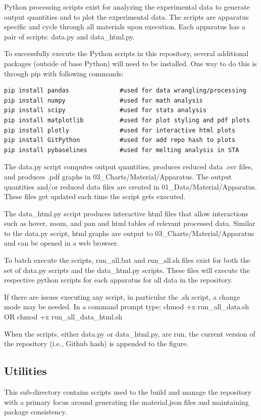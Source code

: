 \documentclass[12pt,oneside]{book}
\begin{document}
Python processing scripts exist for analyzing the experimental data to generate output quantities and to plot the experimental data. The scripts are apparatus specific and cycle through all materials upon execution. Each apparatus has a pair of scripts: data.py and data\_html.py.

To successfully execute the Python scripts in this repository, several additional packages (outside of base Python) will need to be installed. One way to do this is through pip with following commands:

\begin{verbatim}
pip install pandas              #used for data wrangling/processing
pip install numpy               #used for math analysis
pip install scipy               #used for stats analysis
pip install matplotlib          #used for plot styling and pdf plots
pip install plotly              #used for interactive html plots
pip install GitPython           #used for add repo hash to plots
pip install pybaselines         #used for melting analysis in STA
\end{verbatim}

The data.py script computes output quantities, produces reduced data .csv files, and produces .pdf graphs in 03\_Charts/Material/Apparatus. The output quantities and/or reduced data files are created in 01\_Data/Material/Apparatus. These files get updated each time the script gets executed.

The data\_html.py script produces interactive html files that allow interactions such as hover, zoom, and pan and html tables of relevant processed data. Similar to the data.py script, html graphs are output to 03\_Charts/Material/Apparatus and can be opened in a web browser.

To batch execute the scripts, run\_all.bat and run\_all.sh files exist for both the set of data.py scripts and the data\_html.py scripts. These files will execute the respective python scripts for each apparatus for all data in the repository.

If there are issues executing any script, in particular the .sh script, a change mode may be needed. In a command prompt type: chmod +x run\_all\_data.sh OR chmod +x run\_all\_data\_html.sh

When the scripts, either data.py or data\_html.py, are run, the current version of the repository (i.e., Github hash) is appended to the figure.

\subsection{Utilities}
This sub-directory contains scripts used to the build and manage the repository with a primary focus around generating the material.json files and maintaining package consistency.
\end{document}
